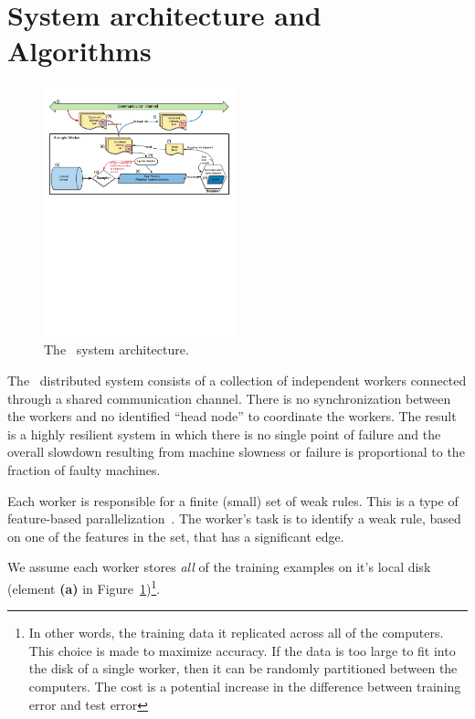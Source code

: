 \section{System architecture and Algorithms} \label{sec:Algorithms}

\begin{figure}
\centering
    \includegraphics[width=0.5\textwidth]{architecture.pdf}
    \caption{The \Sparrow\ system architecture.}\label{fig:architecture}
    \vspace{0pt}
\end{figure}

The \Sparrow\ distributed system consists of a collection of independent workers
connected through a shared communication channel. There is no
synchronization between the workers and no identified ``head node'' to
coordinate the workers. The result is a highly resilient system in which
there is no single point of failure and the overall slowdown resulting
from machine slowness or failure is proportional to the fraction of
faulty machines.

Each worker is responsible for a finite (small) set of weak
rules. This is a type of feature-based
parallelization~\cite{caragea_framework_2004}. The worker's task is to
identify a weak rule, based on one of the features in the set, that has
a significant edge.

We assume each worker stores {\em all} of the training examples
on it's local disk (element {\bf (a)} in Figure~\ref{fig:architecture})\footnote{In other
  words, the training data it replicated across all of the
  computers. This choice is made to maximize accuracy. If the data is
  too large to fit into the disk of a single worker, then it can be
  randomly partitioned between the computers. The cost is a potential increase
  in the difference between training error and test error}.

